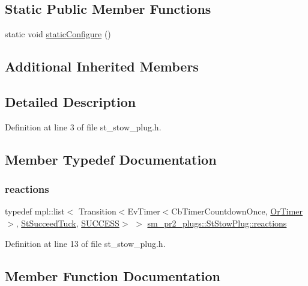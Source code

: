 \subsection*{Static Public Member Functions}
\begin{DoxyCompactItemize}
\item 
static void \hyperlink{structsm__pr2__plugs_1_1StStowPlug_a42733344b68d5558e349bf56db98efd6}{static\+Configure} ()
\end{DoxyCompactItemize}
\subsection*{Additional Inherited Members}


\subsection{Detailed Description}


Definition at line 3 of file st\+\_\+stow\+\_\+plug.\+h.



\subsection{Member Typedef Documentation}
\mbox{\label{structsm__pr2__plugs_1_1StStowPlug_a30e66bd99b3feb400c8896aec05e5c4b}} 
\subsubsection{\texorpdfstring{reactions}{reactions}}
{\footnotesize\ttfamily typedef mpl\+::list$<$ Transition$<$Ev\+Timer$<$Cb\+Timer\+Countdown\+Once, \hyperlink{classsm__pr2__plugs_1_1OrTimer}{Or\+Timer}$>$, \hyperlink{structsm__pr2__plugs_1_1StSucceedTuck}{St\+Succeed\+Tuck}, \hyperlink{classSUCCESS}{S\+U\+C\+C\+E\+SS}$>$ $>$ \hyperlink{structsm__pr2__plugs_1_1StStowPlug_a30e66bd99b3feb400c8896aec05e5c4b}{sm\+\_\+pr2\+\_\+plugs\+::\+St\+Stow\+Plug\+::reactions}}



Definition at line 13 of file st\+\_\+stow\+\_\+plug.\+h.



\subsection{Member Function Documentation}
\mbox{\label{structsm__pr2__plugs_1_1StStowPlug_af7ecd886b25ba936701f57ee7618883d}} 
